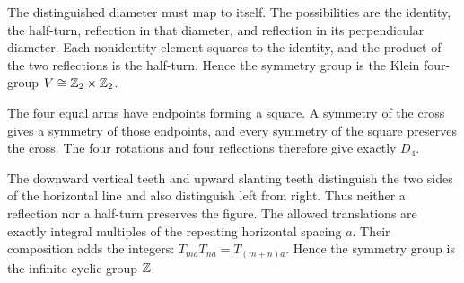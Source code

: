 The distinguished diameter must map to itself. The possibilities are the identity, the half-turn, reflection in that diameter, and reflection in its perpendicular diameter. Each nonidentity element squares to the identity, and the product of the two reflections is the half-turn. Hence the symmetry group is the Klein four-group $V\cong\mathbb{Z}_2\times\mathbb{Z}_2$.

The four equal arms have endpoints forming a square. A symmetry of the cross gives a symmetry of those endpoints, and every symmetry of the square preserves the cross. The four rotations and four reflections therefore give exactly $D_4$.

The downward vertical teeth and upward slanting teeth distinguish the two sides of the horizontal line and also distinguish left from right. Thus neither a reflection nor a half-turn preserves the figure. The allowed translations are exactly integral multiples of the repeating horizontal spacing $a$. Their composition adds the integers: $T_{ma}T_{na}=T_{(m+n)a}$. Hence the symmetry group is the infinite cyclic group $\mathbb{Z}$.


